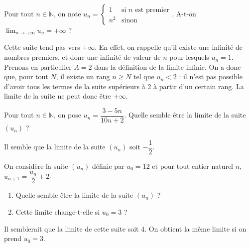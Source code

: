 \documentclass[11pt,fleqn]{book} %
\begin{document}
\begin{exercise}Pour tout $n\in\mathbb{N}$, on note $u_n=\left\{\begin{array}{ll} 1 & \text{si } n \text{ est premier}\\
n^2 & \text{sinon}

\end{array}\right.$. A-t-on $\displaystyle \lim _{n\to +\infty} u_n = +\infty$ ?\end{exercise}
\begin{solution}Cette suite tend pas vers $+\infty$. En effet, on rappelle qu'il existe une infinité de nombres premiers, et donc une infinité de valeur de $n$ pour lesquels $u_n = 1$. Prenons en particulier $A=2$ dans la définition de la limite infinie. On a donc que, pour tout $N$, il existe un rang $n \geqslant N$ tel que $u_n < 2$ : il n'est pas possible d'avoir tous les termes de la suite supérieurs à 2 à partir d'un certain rang. La limite de la suite ne peut donc être $+\infty$. \end{solution}




\begin{exercise}Pour tout $n\in\mathbb{N}$, on pose $u_n=\dfrac{3-5n}{10n+2}$. Quelle semble être la limite de la suite $(u_n)$ ?\end{exercise}
\begin{solution}Il semble que la limite de la suite $(u_n)$ soit $-\dfrac{1}{2}$.\end{solution}



\begin{exercise}On considère la suite $(u_n)$ définie par $u_0=12$ et pour tout entier naturel $n$, $u_{n+1}= \dfrac{u_n}{2}+2$. 

\begin{enumerate}
\item Quelle semble être la limite de la suite $(u_n)$ ?
\item Cette limite change-t-elle si $u_0=3$ ?\end{enumerate}\end{exercise}
\begin{solution}Il semblerait que la limite de cette suite soit 4. On obtient la même limite si on prend $u_0=3$.\end{solution}
\end{document}
